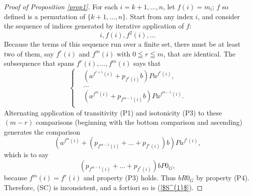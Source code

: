 \documentclass[pdflatex,sn-apa,11pt]{sn-jnl}%
\begin{document}
\begin{proof}[Proof of Proposition \ref{prop1}]
For each $i = k+1, \dots, n$, let $f(i) = m_i$; $f$ so defined is a permutation of $\{k+1, \dots, n\}$. Start from any index $i$, and consider the sequence of indices generated by iterative application of $f$: \begin{equation*}i, f(i), f^{2}(i), \dots\end{equation*} 
Because the terms of this sequence run over a finite set, there must be at least two of them, say $f^{r}(i)$ and $f^{m}(i)$ with $0 \leqq r \leqq m$, that are identical. The subsequence that spans $f^{r}(i), \dots, f^{m}(i)$ says that \begin{equation*}
  \left\{
    \begin{aligned}
      & (a^{f^{r+1}(i)} + p_{f^{r}(i)}b)Pa^{f^{r}(i)}, \\
      & \dots \\
      & (a^{f^{m}(i)} + p_{f^{m-1}(i)}b)Pa^{f^{m-1}(i)}. \\
    \end{aligned}
  \right.
\end{equation*}
Alternating application of transitivity (P1) and isotonicity (P3) to these $(m-r)$ comparisons (beginning with the bottom comparison and ascending) generates the comparison \begin{equation*}(a^{f^{m}(i)} + (p_{f^{m-1}(i)}+\dots + p_{f^{r}(i)})b)Pa^{f^{r}(i)},\end{equation*}
which is to say \begin{equation*}(p_{f^{m-1}(i)}+\dots + p_{f^{r}(i)})bP0_G,\end{equation*}
because $f^{m}(i) = f^{r}(i)$ and property (P3) holds. Thus $bR0_G$ by property (P4). Therefore, (SC) is inconsistent, and a fortiori so is (\ref{$S^{1}$}).

\end{proof}
\end{document}
